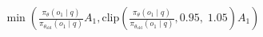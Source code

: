 \documentclass[preview]{standalone}
\begin{document}
\begin{align*}
\min \left(\frac{\pi_\theta(o_1 \mid q)}{\pi_{\theta_{\text{old}}}(o_1 \mid q)} A_1,\text{clip} \left(\frac{\pi_\theta(o_1 \mid q)}{\pi_{\theta_{\text{old}}}(o_1 \mid q)},0.95,\; 1.05\right) A_1\right)
\end{align*}
\end{document}
